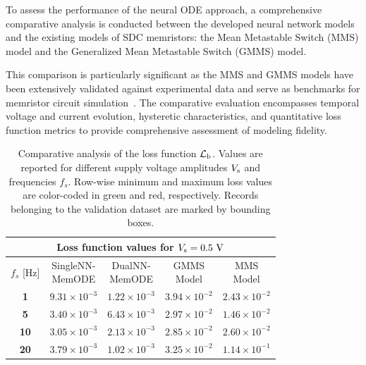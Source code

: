 \documentclass[a4,journal]{IEEEtran}
\newcommand{\Vs}{V_{\rm s}}
\newcommand{\Loss}{\mathcal{L}}
\newcommand{\LossBase}{\Loss_{\rm b}}
\newcommand{\MemODE}{MemODE}
\newcommand{\mtimes}{\!\times\!}
\begin{document}
\noindent To assess the performance of the neural ODE approach, a comprehensive comparative analysis is conducted between the developed neural network models and the existing models of SDC memristors: the Mean Metastable Switch (MMS) model and the Generalized Mean Metastable Switch (GMMS) model.

This comparison is particularly significant as the MMS and GMMS models have been extensively validated against experimental data and serve as benchmarks for memristor circuit simulation~\cite{Ostrovskii2021,Bednarz2024}. The comparative evaluation encompasses temporal voltage and current evolution, hysteretic characteristics, and quantitative loss function metrics to provide comprehensive assessment of modeling fidelity.


\begin{table}[htbp]
  \caption{Comparative analysis of the loss function \(\LossBase\). Values are reported for different supply voltage amplitudes \(\Vs\) and frequencies \(f_s\). Row-wise minimum and maximum loss values are color-coded in green and red, respectively. Records belonging to the validation dataset are marked by bounding boxes. }
  \label{tab:mms_comp}
  \centering
  \begin{tabular}{c|cccc}
    \toprule
    \multicolumn{5}{c}{\textbf{Loss function values for \(\Vs  = 0.5 \rm \ V\)}}  \\
    \midrule
    \(f_s\) [Hz] & \makecell{SingleNN-\\MemODE} & \makecell{DualNN-\\ MemODE} & \makecell{GMMS\\Model} & \makecell{MMS\\Model}\\
    \midrule
\textbf{1} & \(9.31 \mtimes 10^{-3}\) & \color{ieeegreen} \bfseries \(1.22 \mtimes 10^{-3}\) & \color{ieeered} \bfseries \(3.94 \mtimes 10^{-2}\) & \(2.43 \mtimes 10^{-2}\) \\
\cline{1-5}
\multicolumn{1}{|c|}{\textbf{5}} &  \color{ieeegreen} \bfseries \(3.40 \mtimes 10^{-3}\)  &  \(6.43 \mtimes 10^{-3}\)  &  \color{ieeered} \bfseries \(2.97 \mtimes 10^{-2}\)  & \multicolumn{1}{c|}{\(1.46 \mtimes 10^{-2}\) } \\
\cline{1-5}
\textbf{10} & \(3.05 \mtimes 10^{-3}\) & \color{ieeegreen} \bfseries \(2.13 \mtimes 10^{-3}\) & \color{ieeered} \bfseries \(2.85 \mtimes 10^{-2}\) & \(2.60 \mtimes 10^{-2}\) \\
\textbf{20} & \(3.79 \mtimes 10^{-3}\) & \color{ieeegreen} \bfseries \(1.02 \mtimes 10^{-3}\) & \(3.25 \mtimes 10^{-2}\) & \color{ieeered} \bfseries \(1.14 \mtimes 10^{-1}\) \\

\end{tabular}
\end{table}
\end{document}
